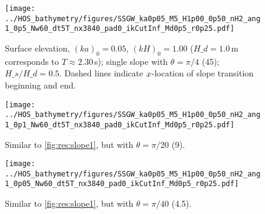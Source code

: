 \begin{figure}[H]%
\centering
\texttt{[image: ../HOS\_bathymetry/figures/SSGW\_ka0p05\_M5\_H1p00\_0p50\_nH2\_ang1\_0p5\_Nw60\_dt5T\_nx3840\_pad0\_ikCutInf\_Md0p5\_r0p25.pdf]}%
\caption{Surface elevation, $(ka)_0 = 0.05$, $(kH)_0 = 1.00$ ($H\_d=1.0$\,m corresponds to $T\approx2.30$\,s); single slope with $\theta=\pi/4$ (45\textdegree); $H\_s/H\_d = 0.5$. Dashed lines indicate $x$-location of slope transition beginning and end.}%
\label{fig:res:slope1}%
\end{figure}
\begin{figure}[H]%
\centering 
\texttt{[image: ../HOS\_bathymetry/figures/SSGW\_ka0p05\_M5\_H1p00\_0p50\_nH2\_ang1\_0p1\_Nw60\_dt5T\_nx3840\_pad0\_ikCutInf\_Md0p5\_r0p25.pdf]}%
\caption{Similar to \autoref{fig:res:slope1}, but with $\theta=\pi/20$  (9\textdegree).}%
\label{fig:res:slope2}%
\end{figure}
\begin{figure}[H]%
\centering 															  
\texttt{[image: ../HOS\_bathymetry/figures/SSGW\_ka0p05\_M5\_H1p00\_0p50\_nH2\_ang1\_0p05\_Nw60\_dt5T\_nx3840\_pad0\_ikCutInf\_Md0p5\_r0p25.pdf]}%
\caption{Similar to \autoref{fig:res:slope1}, but with $\theta=\pi/40$ (4.5\textdegree).}%
\label{fig:res:slope3}%
\end{figure}








%